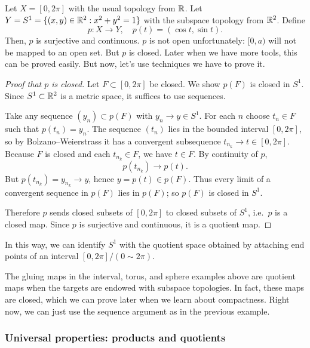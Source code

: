 \begin{example}
  Let $X=[0,2\pi]$ with the usual topology from $\mathbb{R}$. Let $Y=S^1=\{(x,y)\in\mathbb{R}^2:x^2+y^2=1\}$ with the subspace topology from $\mathbb{R}^2$. Define
  \[
  p:X\to Y,\quad p(t)=(\cos t,\sin t).
  \]
  Then, $p$ is surjective and continuous. $p$ is not open unfortunately: $[0,a)$ will not be mapped to an open set. But $p$ is closed. Later when we have more tools, this can be proved easily. But now, let's use techniques we have to prove it.

  \begin{proof}[Proof that $p$ is closed]
  Let $F\subset[0,2\pi]$ be closed. We show $p(F)$ is closed in $S^{1}$.
  Since $S^{1}\subset\mathbb{R}^{2}$ is a metric space, it suffices to use sequences.

  Take any sequence $(y_n)\subset p(F)$ with $y_n\to y\in S^{1}$. For each $n$ choose
  $t_n\in F$ such that $p(t_n)=y_n$. The sequence $(t_n)$ lies in the bounded interval
  $[0,2\pi]$, so by Bolzano–Weierstrass it has a convergent subsequence
  $t_{n_k}\to t\in[0,2\pi]$. Because $F$ is closed and each $t_{n_k}\in F$, we have $t\in F$.
  By continuity of $p$,
  \[
  p(t_{n_k}) \longrightarrow p(t).
  \]
  But $p(t_{n_k})=y_{n_k}\to y$, hence $y=p(t)\in p(F)$. Thus every limit of a convergent
  sequence in $p(F)$ lies in $p(F)$; so $p(F)$ is closed in $S^{1}$.

  Therefore $p$ sends closed subsets of $[0,2\pi]$ to closed subsets of $S^{1}$, i.e.\ $p$ is a
  closed map. Since $p$ is surjective and continuous, it is a quotient map.
  \end{proof}

  In this way, we can identify $S^1$ with the quotient space obtained by attaching end points of an interval $[0,2\pi]/(0\sim 2\pi)$.
\end{example}

\begin{remark}
  The gluing maps in the interval, torus, and sphere examples above are quotient maps when the targets are endowed with subspace topologies. In fact, these maps are closed, which we can prove later when we learn about compactness. Right now, we can just use the sequence argument as in the previous example.
\end{remark}



\subsubsection{Universal properties: products and quotients}

